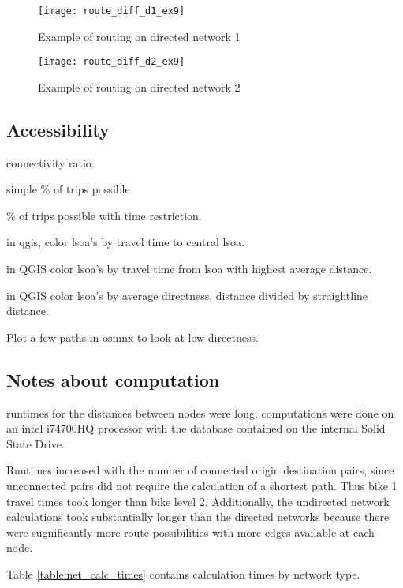 \begin{figure}
\centering
\texttt{[image: route\_diff\_d1\_ex9]}
\caption{Example of routing on directed network 1}
\label{fig:routing_1}
\end{figure}

\begin{figure}
\centering
\texttt{[image: route\_diff\_d2\_ex9]}
\caption{Example of routing on directed network 2}
\label{fig:routing_2}
\end{figure}

\subsection{Accessibility}

connectivity ratio.

 

simple \% of trips possible

\% of trips possible with time restriction. 

in qgis, color lsoa's by travel time to central lsoa. 

in QGIS color lsoa's by travel time from lsoa with highest average distance. 

in QGIS color lsoa's by  average directness, distance divided by straightline distance. 

Plot a few paths in osmnx to look at low directness. 





\subsection{Notes about computation}

runtimes for the distances between nodes were long. computations were done on an intel i74700HQ processor with the database contained on the internal Solid State Drive. 

Runtimes increased with the number of connected origin destination pairs, since unconnected pairs  did not require the calculation of a shortest path. Thus bike 1 travel times took longer than bike level 2. Additionally, the undirected network calculations took substantially longer than the directed networks because there were sugnificantly more route possibilities with more edges available at each node. 

Table \ref{table:net_calc_times} contains calculation times by network type. 


